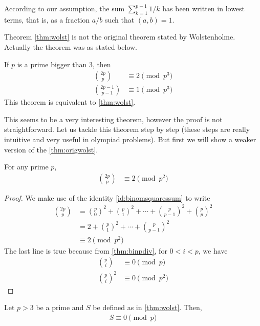 \documentclass[12pt]{subfile}
\begin{document}
		\begin{note}
			According to our assumption, the sum $ \sum_{k=1}^{p-1} 1/k$ has been written in lowest terms, that is, as a fraction $a/b$ such that $(a,b)=1$.
		\end{note}

		\begin{remark}
			Theorem \eqref{thm:wolst} is not the original theorem stated by Wolstenholme. Actually the theorem was as stated below.
		\end{remark}

		\begin{theorem}\label{thm:origwolst}
			If $p$ is a prime bigger than $3$, then
			\begin{align*}
				\binom{2p}{p} & \equiv2\pmod{p^3}\\
				\binom{2p-1}{p-1} & \equiv 1 \pmod{p^3}
			\end{align*}
			This theorem is equivalent to \autoref{thm:wolst}.
		\end{theorem}
	This seems to be a very interesting theorem, however the proof is not straightforward. Let us tackle this theorem step by step (these steps are really intuitive and very useful in olympiad problems). But first we will show a weaker version of the \autoref{thm:origwolst}.
		\begin{theorem}
			For any prime $p$,
				\begin{align*}
					\binom{2p}{p} & \equiv2\pmod{p^2}
				\end{align*}
		\end{theorem}

		\begin{proof}
			We make use of the identity \eqref{id:binomsquaressum} to write
				\begin{align*}
					\binom{2p}p & = \binom{p}0^2+\binom{p}{1}^2+\cdots+\binom{p}{p-1}^2+\binom{p}{p}^2\\
								& = 2+\binom{p}{1}^2+\cdots+\binom{p}{p-1}^2\\
								& \equiv2\pmod{p^2}
				\end{align*}
			The last line is true because from \autoref{thm:binpdiv}, for $0<i<p$, we have
				\begin{align*}
					\binom{p}{i}
						& \equiv 0\pmod p\\
					\binom{p}{i}^2
						& \equiv 0\pmod{p^2}
				\end{align*}
		\end{proof}

		\begin{lemma}\label{lem:wolstproof1}
			Let $p>3$ be a prime and $S$ be defined as in \autoref{thm:wolst}. Then,
				\begin{align*}
					S \equiv 0 \pmod p
				\end{align*}
		\end{lemma}
\end{document}
